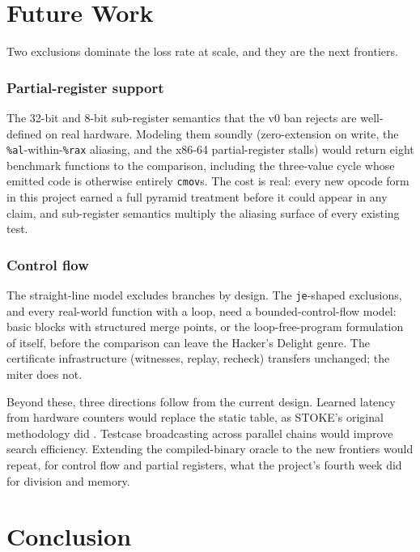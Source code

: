 \documentclass[journal,10pt]{IEEEtran}
\begin{document}
\section{Future Work}
\label{sec:future}

Two exclusions dominate the loss rate at scale, and they are the next
frontiers.

\subsubsection{Partial-register support} The 32-bit and 8-bit
sub-register semantics that the v0 ban rejects are well-defined on
real hardware. Modeling them soundly (zero-extension on write, the
\texttt{\%al}-within-\texttt{\%rax} aliasing, and the x86-64
partial-register stalls) would return eight benchmark functions to the
comparison, including the three-value cycle whose emitted code is
otherwise entirely \texttt{cmov}s. The cost is real: every new opcode
form in this project earned a full pyramid treatment before it could
appear in any claim, and sub-register semantics multiply the aliasing
surface of every existing test.

\subsubsection{Control flow} The straight-line model excludes branches
by design. The \texttt{je}-shaped exclusions, and every real-world
function with a loop, need a bounded-control-flow model: basic blocks
with structured merge points, or the loop-free-program formulation of
\cite{gulwani11} itself, before the comparison can leave the Hacker's
Delight genre. The certificate infrastructure (witnesses, replay,
recheck) transfers unchanged; the miter does not.

Beyond these, three directions follow from the current design. Learned
latency from hardware counters would replace the static table, as
STOKE's original methodology did \cite{stoke13}. Testcase broadcasting
across parallel chains would improve search efficiency. Extending the
compiled-binary oracle to the new frontiers would repeat, for control
flow and partial registers, what the project's fourth week did for
division and memory.

\section{Conclusion}
\label{sec:conclusion}
\end{document}
